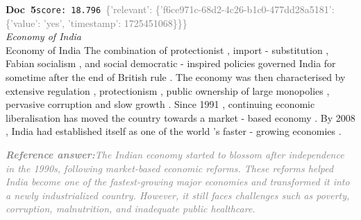 \documentclass[a4paper,11pt]{article}
\begin{document}
\begin{docenv}
{\footnotesize\textcolor{doccolor}{\textbf{Doc~5}}}\hfill{\tiny\texttt{score:~18.796}}\ {\tiny\textcolor{gray}{\{'relevant': \{'f6ce971c-68d2-4c26-b1c0-477dd28a5181': \{'value': 'yes', 'timestamp': 1725451068\}\}\}}}\\[3pt]
{\small\textit{Economy of India}}\\[2pt]
\vspace{2pt}
{\footnotesize Economy of India
The combination of protectionist , import - substitution , Fabian socialism , and social democratic - inspired policies governed India for sometime after the end of British rule . The economy was then characterised by extensive regulation , protectionism , public ownership of large monopolies , pervasive corruption and slow growth . Since 1991 , continuing economic liberalisation has moved the country towards a market - based economy . By 2008 , India had established itself as one of the world 's faster - growing economies .}
\end{docenv}
\begin{refanswerenv}
{\footnotesize\textit{\textcolor{gray}{\textbf{Reference answer:}\enspace The Indian economy started to blossom after independence in the 1990s, following market-based economic reforms. These reforms helped India become one of the fastest-growing major economies and transformed it into a newly industrialized country. However, it still faces challenges such as poverty, corruption, malnutrition, and inadequate public healthcare.}}}
\end{refanswerenv}
\end{document}
